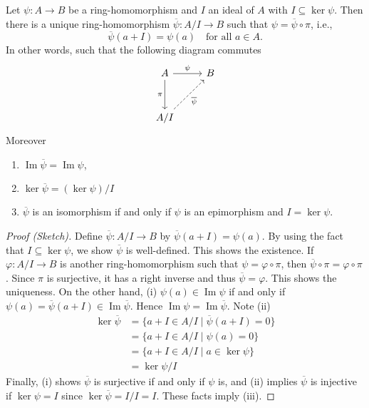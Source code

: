 \documentclass[11pt,a4paper]{article}
\begin{document}
\begin{teo}
    Let  $\psi : A \to B$ be a ring-homomorphism   and $I$   an ideal of $A$ with \(I\subseteq \ker \psi\).
    Then    there is a unique ring-homomorphism $\overline{\psi}\colon A/I \to B$ such that \(\psi = \overline{\psi}\circ \pi\), i.e.,  $$\overline{\psi}(a + I) = \psi(a)\quad\text{for all }a \in A.$$
    In other words, such that  the following diagram commutes \[
\begin{tikzcd}[row sep={3em}]
A \arrow[r, "\psi"] \arrow[d, "\pi"'] & B \\
A/I \arrow[ru, dashed, "\overline{\psi}"'] &
\end{tikzcd}
\]
    Moreover
    \begin{enumerate}[label=(\roman*)]
        \item $\operatorname{Im} \overline{\psi} = \operatorname{Im} \psi$,
        \item $\ker \overline{\psi} = (\ker \psi)/I$
        \item $\overline{\psi}$ is an isomorphism if and only if $\psi$ is an epimorphism and $I = \ker \psi$.
    \end{enumerate}  
\end{teo}

\begin{proof}[Proof (Sketch)]
    Define \(\overline{\psi}\colon A/I\to B\) by \(\overline{\psi}(a+I) = \psi(a)\).
    By using the fact that  \(I\subseteq \ker \psi\), we show \(\overline{\psi}\) is well-defined.
    This shows the existence.
    If \(\varphi\colon A/I\to B\) is another ring-homomorphism such that \(\psi = \varphi\circ \pi\), then 
    \(\overline{\psi}\circ \pi = \varphi\circ\pi\).
    Since \(\pi\) is surjective, it has a right inverse and thus  \(\overline{\psi}  = \varphi\).
    This shows the uniqueness.
    On the other hand, (i) $\psi(a) \in \operatorname{Im} \psi$ if and only if $\psi(a) = \overline{\psi}(a+I) \in \operatorname{Im} \overline{\psi}$. Hence $\operatorname{Im} \psi = \operatorname{Im} \overline{\psi}$. Note (ii)    \begin{align*}
        \ker \overline{\psi} &= \{a +I\in A/I \mid \overline{\psi}(a+I) = 0\} \\
        &= \{a+I \in A/I \mid \psi(a) = 0\} \\
        &= \{a+I \in A/I \mid a \in \ker \psi\} \\
        &= \ker \psi / I
        \end{align*}
    Finally, (i) shows \(\overline{\psi}\) is surjective if and only if \(\psi\) is, and (ii) implies \(\overline{\psi}\) is injective if \(\ker\psi = I\) since \(\ker\overline{\psi} = I/I = I\).
    These facts imply (iii).
\end{proof}
\end{document}
